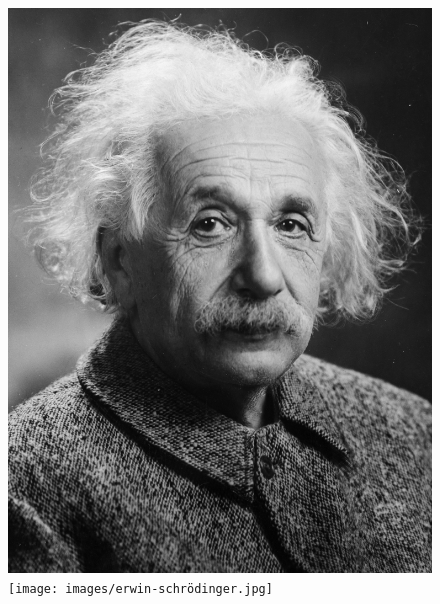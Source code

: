 \documentclass[crop=false]{standalone}
\begin{document}
\begin{figure}[H]
    \includegraphics[width=\linewidth]{images/albert-einstein.jpeg}
  \endminipage\hfill
    \texttt{[image: images/erwin-schrödinger.jpg]}
  \endminipage\hfill

\end{figure}
\end{document}
